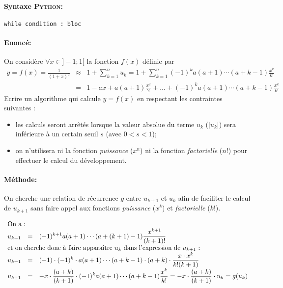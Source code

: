 \documentclass[11pt,a4paper,colorlinks,breaklinks]{article}
\def\python{\textsc{Python}}
\begin{document}
\paragraph{Syntaxe \python:} \texttt{while condition : bloc}

\begin{framed}
\paragraph{Enoncé:}
On considère $\forall x \in ]-1;1[$ la fonction $f(x)$ définie par 
$$\begin{array}{lll}
\displaystyle y = f(x) = \frac{1}{(1+x)^a} & \approx &\displaystyle  1 + \sum_{k=1}^{n} u_k  = 1 + \sum_{k=1}^{n} (-1)^k a(a+1)\cdots(a+k-1)\frac{x^k}{k!}\\
	           & = &\displaystyle 1 - ax + a(a+1)\frac{x^2}{2} + \ldots +
(-1)^k a(a+1)\cdots(a+k-1)\frac{x^k}{k!}
\end{array}$$
Ecrire un algorithme qui calcule $y = f(x)$ en respectant les 
contraintes suivantes :
\begin{itemize}
\item les calculs seront arrêtés lorsque la valeur absolue du terme $u_k$ ($|u_k|$) 
	sera inférieure à un certain seuil $s$ (avec $0 < s < 1$);
\item on n'utilisera ni la fonction \emph{puissance} ($x^n$) ni la fonction
	\emph{facto\-riel\-le} ($n!$) pour effectuer le calcul du développement.
\end{itemize}
\end{framed}

\paragraph{Méthode:}
On cherche une relation de récurrence $g$ entre $u_{k+1}$ et $u_k$ afin de faciliter le calcul de $u_{k+1}$ 
sans faire appel aux fonctions \emph{puissance} ($x^{k}$) et \emph{factorielle} ($k!$).

$$\begin{array}{lll}
\multicolumn{3}{l}{\mbox{On a :}} \\
\displaystyle u_{k+1} &=& \displaystyle (-1)^{k+1} a(a+1)\cdots(a+(k+1)-1)\frac{x^{k+1}}{(k+1)!} \\
\multicolumn{3}{l}{\mbox{et on cherche donc à faire apparaître $u_k$ dans l'expression de $u_{k+1}$ :}}\\
\displaystyle u_{k+1} &=& \displaystyle (-1)\cdot(-1)^k\cdot a(a+1)\cdots(a+k-1)\cdot(a+k)\cdot\frac{x\cdot x^k}{k!(k+1)}\\
\displaystyle u_{k+1} &=& \displaystyle - x\cdot\frac{(a+k)}{(k+1)}\cdot (-1)^k a(a+1)\cdots(a+k-1)\frac{x^k}{k!} = \displaystyle - x\cdot\frac{(a+k)}{(k+1)}\cdot u_k
= g(u_k)
\end{array}$$
\end{document}

